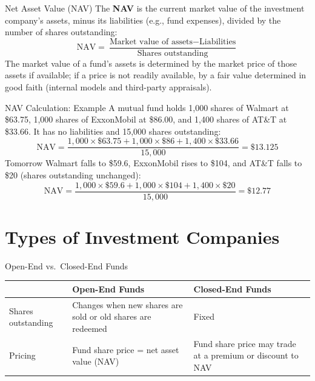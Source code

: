 \documentclass[aspectratio=169]{beamer}
\begin{document}
\begin{frame}{Net Asset Value (NAV)}
The \textbf{NAV} is the current market value of the investment company's assets, minus its liabilities (e.g., fund expenses), divided by the number of shares outstanding:
\begin{equation*}
\mathrm{NAV} = \frac{\text{Market value of assets} - \text{Liabilities}}{\text{Shares outstanding}}
\end{equation*}
The market value of a fund's assets is determined by the market price of those assets if available; if a price is not readily available, by a fair value determined in good faith (internal models and third-party appraisals).
\end{frame}

\begin{frame}{NAV Calculation: Example}
A mutual fund holds 1,000 shares of Walmart at \$63.75, 1,000 shares of ExxonMobil at \$86.00, and 1,400 shares of AT\&T at \$33.66. It has no liabilities and 15,000 shares outstanding:
\begin{equation*}
\mathrm{NAV} = \frac{1{,}000 \times \$63.75 + 1{,}000 \times \$86 + 1{,}400 \times \$33.66}{15{,}000} = \$13.125
\end{equation*}
Tomorrow Walmart falls to \$59.6, ExxonMobil rises to \$104, and AT\&T falls to \$20 (shares outstanding unchanged):
\begin{equation*}
\mathrm{NAV} = \frac{1{,}000 \times \$59.6 + 1{,}000 \times \$104 + 1{,}400 \times \$20}{15{,}000} = \$12.77
\end{equation*}
\end{frame}

\section{Types of Investment Companies}

\begin{frame}{Open-End vs.\ Closed-End Funds}
\begin{table}
\centering
\small
\begin{tabular}{p{}p{}p{}}
\toprule
 & \textbf{Open-End Funds} & \textbf{Closed-End Funds} \\
\midrule
Shares outstanding & Changes when new shares are sold or old shares are redeemed & Fixed \\
Pricing & Fund share price = net asset value (NAV) & Fund share price may trade at a premium or discount to NAV \\
\bottomrule
\end{tabular}
\end{table}
\end{frame}
\end{document}
